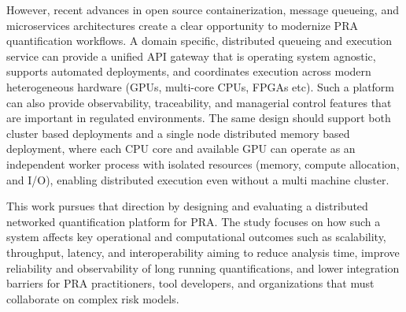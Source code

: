 However, recent advances in open source containerization, message queueing, and microservices architectures create a clear opportunity to modernize PRA quantification workflows. A domain specific, distributed queueing and execution service can provide a unified API gateway that is operating system agnostic, supports automated deployments, and coordinates execution across modern heterogeneous hardware (GPUs, multi-core CPUs, FPGAs etc). Such a platform can also provide observability, traceability, and managerial control features that are important in regulated environments. The same design should support both cluster based deployments and a single node distributed memory based deployment, where each CPU core and available GPU can operate as an independent worker process with isolated resources (memory, compute allocation, and I/O), enabling distributed execution even without a multi machine cluster.

This work pursues that direction by designing and evaluating a distributed networked quantification platform for PRA. The study focuses on how such a system affects key operational and computational outcomes such as scalability, throughput, latency, and interoperability aiming to reduce analysis time, improve reliability and observability of long running quantifications, and lower integration barriers for PRA practitioners, tool developers, and organizations that must collaborate on complex risk models.


